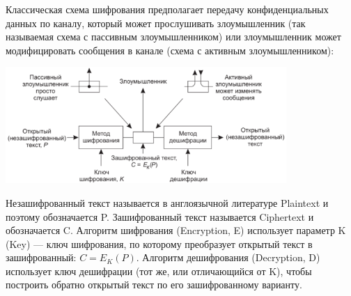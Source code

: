 \documentclass{../../text-style}
\begin{document}
Классическая схема шифрования предполагает передачу конфиденциальных данных по каналу, который может прослушивать злоумышленник (так называемая схема с пассивным злоумышленником) или злоумышленник может модифицировать сообщения в канале (схема с активным злоумышленником):

\begin{center}
    \includegraphics[width=0.8\textwidth]{cryptography.png}
\end{center}

Незашифрованный текст называется в англоязычной литературе Plaintext и поэтому обозначается P. Зашифрованный текст называется Ciphertext и обозначается C. Алгоритм шифрования (Encryption, E) использует параметр K (Key) --- ключ шифрования, по которому преобразует открытый текст в зашифрованный: $C = E_K(P)$. Алгоритм дешифрования (Decryption, D) использует ключ дешифрации (тот же, или отличающийся от K), чтобы построить обратно открытый текст по его зашифрованному варианту.
\end{document}
